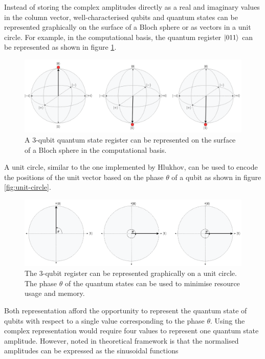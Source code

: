 Instead of storing the complex amplitudes directly as a real and imaginary values in the column vector, well-characterised qubits and quantum states can be represented graphically on the surface of a Bloch sphere or as vectors in a unit circle. For example, in the computational basis, the quantum register $\ket{011}$ can be represented as shown in figure \ref{fig:bloch-011}. 
\begin{figure}[!ht]
	\centering
	\includegraphics[width=0.94\linewidth]{body/ch4/figs/bloch-011}
	\caption[Bloch Sphere Representation of the Integer 3.]{A 3-qubit quantum state register can be represented on the surface of a Bloch sphere in the computational basis.}
	\label{fig:bloch-011}
\end{figure}
A unit circle, similar to the one implemented by Hlukhov, can be used to encode the positions of the unit vector based on the phase $\theta$ of a qubit as shown in figure \ref{fig:unit-circle}. 
\begin{figure}[!ht]
	\centering
	\includegraphics[width=0.94\linewidth]{body/ch4/figs/unit-circle-011}
	\caption[Unit Circle Graphical Representation of Integer 3.]{The 3-qubit register can be represented graphically on a unit circle. The phase $\theta$ of the quantum states can be used to minimise resource usage and memory.}
	\label{fig:unit-circle-011}
\end{figure}
Both representation afford the opportunity to represent the quantum state of qubits with respect to a single value corresponding to the phase $\theta$. Using the complex representation would require four values to represent one quantum state amplitude. However, noted in theoretical framework is that the normalised amplitudes can be expressed as the sinusoidal functions
